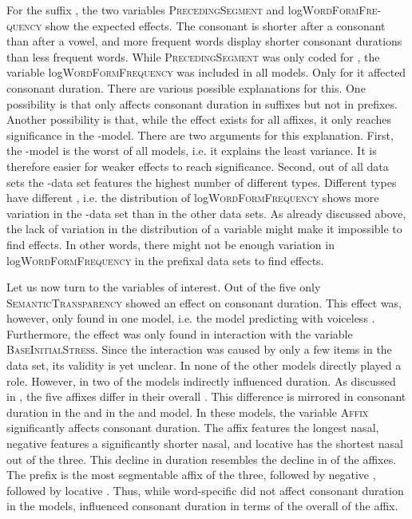 For the suffix , the two variables \textsc{PrecedingSegment} and log\textsc{WordFormFre-quency} show the expected effects. The consonant is shorter after a consonant than after a vowel, and more frequent words display shorter consonant durations than less frequent words. While \textsc{PrecedingSegment} was only coded for , the variable log\textsc{WordFormFrequency} was included in all models. Only for  it affected consonant duration. There are various possible explanations for this. 
One possibility is that  only affects consonant duration in suffixes but not in prefixes. Another possibility is that, while the effect exists for all affixes, it only reaches significance in the -model. There are two arguments for this explanation.
 First, the -model is the worst of all models, i.e. it explains the least variance. It is therefore easier for weaker effects to reach significance. 
 Second, out of all data sets the -data set features the highest number of different types. Different types have different , i.e. the distribution of log\textsc{WordFormFrequency} shows more variation in the -data set than in the other data sets. As already discussed above, the lack of variation in the distribution of a variable might make it impossible to find effects. In other words, there might not be enough variation in log\textsc{WordFormFrequency} in the prefixal data sets to find effects.


Let us now turn to the variables of interest. Out of the five  only \textsc{SemanticTransparency} showed an effect on consonant duration. This effect was, however, only found in one model, i.e. the model predicting  with voiceless .  Furthermore, the effect was only found in interaction with the variable \textsc{BaseInitialStress}. Since the interaction was caused by only a few items in the data set, its validity is yet unclear. 
In none of the other models  directly played a role. 
However, in two of the models  indirectly influenced duration. As discussed in , the five affixes differ in their overall . This difference is mirrored in consonant duration in the  and in the  and  model. In these models, the variable \textsc{Affix} significantly affects consonant duration. The affix  features the longest nasal, negative  features a significantly shorter nasal, and locative  has the shortest nasal out of the three. This decline in duration resembles the decline in  of the affixes. The prefix  is the most segmentable affix of the three, followed by negative , followed by locative . Thus, while word-specific  did not affect consonant duration in the models,  influenced consonant duration in terms of the overall  of the affix.



